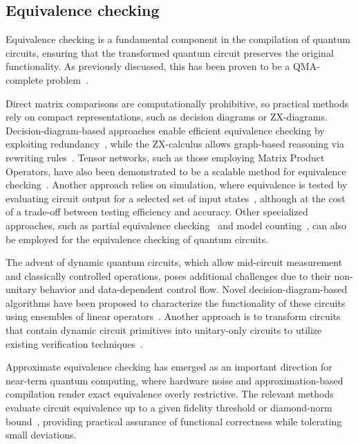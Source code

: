 \documentclass[a4paper,onecolumn,11pt,unpublished]{quantumarticle}
\begin{document}
\subsection{Equivalence checking}

Equivalence checking is a fundamental component in the compilation of quantum circuits, ensuring that the transformed quantum circuit preserves the original functionality. As previously discussed, this has been proven to be a QMA-complete problem~\cite{Janzing2005}. 

Direct matrix comparisons are computationally prohibitive, so practical methods rely on compact representations, such as decision diagrams or ZX-diagrams. Decision-diagram-based approaches enable efficient equivalence checking by exploiting redundancy~\cite{Hong2022Equivalence,Wille2022Tools,Burgholzer2020Advanced}, while the ZX-calculus allows graph-based reasoning via rewriting rules~\cite{Peham2022Equivalence}.
Tensor networks, such as those employing Matrix Product Operators, have also been demonstrated to be a scalable method for equivalence checking~\cite{Sander2025Equivalence}. Another approach relies on simulation, where equivalence is tested by evaluating circuit output for a selected set of input states~\cite{Burgholzer2020The,Burgholzer2021Random}, although at the cost of a trade-off between testing efficiency and accuracy. Other specialized approaches, such as partial equivalence checking~\cite{Chen2022Partial} and model counting~\cite{Mei2024Equivalence}, can also be employed for the equivalence checking of quantum circuits.

The advent of dynamic quantum circuits, which allow mid-circuit measurement and classically controlled operations, poses additional challenges due to their non-unitary behavior and data-dependent control flow. Novel decision-diagram-based algorithms have been proposed to characterize the functionality of these circuits using ensembles of linear operators~\cite{Hong2022Equivalence}.  
Another approach is to transform circuits that contain dynamic circuit primitives into unitary-only circuits to utilize existing verification techniques~\cite{Wille2022Handling}.

Approximate equivalence checking has emerged as an important direction for near-term quantum computing, where hardware noise and approximation-based compilation render exact equivalence overly restrictive. The relevant methods evaluate circuit equivalence up to a given fidelity threshold or diamond-norm bound~\cite{Hong2022Approximate,huang_approximation_2025}, providing practical assurance of functional correctness while tolerating small deviations.
    
\end{document}
